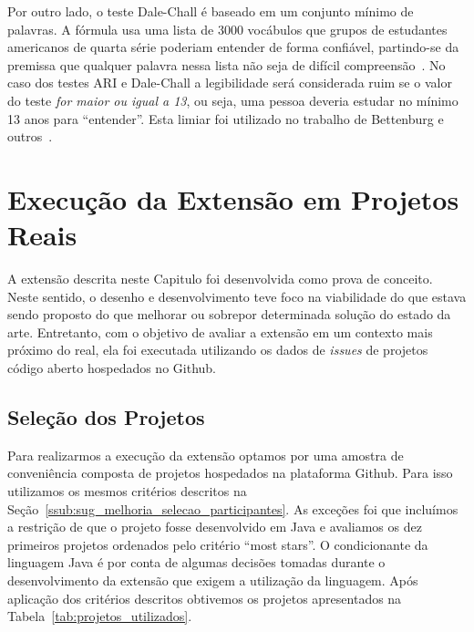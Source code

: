 Por outro lado, o teste Dale-Chall é baseado em um conjunto mínimo de palavras.
A fórmula usa uma lista de 3000 vocábulos que grupos de estudantes americanos de
quarta série poderiam entender de forma confiável, partindo-se da premissa que
qualquer palavra nessa lista não seja de difícil
compreensão~\cite{dale1948formula}. No caso dos testes ARI e Dale-Chall a
legibilidade será considerada ruim se o valor do teste \textit{for maior ou
    igual a 13}, ou seja, uma pessoa deveria estudar no mínimo 13 anos para
``entender''. Esta limiar foi utilizado no trabalho de Bettenburg e
outros~\cite{bettenburg2008makes}.

\section{Execução da Extensão em Projetos Reais}
\label{sec:avaliando_a_extensao_proposta}

A extensão descrita neste Capitulo foi desenvolvida como prova de conceito.
Neste sentido, o desenho e desenvolvimento teve foco na viabilidade do que
estava sendo proposto do que melhorar ou sobrepor determinada solução do estado
da arte. Entretanto, com o objetivo de avaliar a extensão em um contexto mais
próximo do real, ela foi executada utilizando os dados de \textit{issues} de
projetos código aberto hospedados no Github.

\subsection{Seleção dos Projetos}
\label{sub:implementacao_selecao_projetos}

Para realizarmos a execução da extensão optamos por uma amostra de conveniência
composta de projetos hospedados na plataforma Github. Para isso utilizamos os
mesmos critérios descritos na
Seção~\ref{ssub:sug_melhoria_selecao_participantes}. As exceções foi que
incluímos a restrição de que o projeto fosse desenvolvido em Java e avaliamos os
dez primeiros projetos ordenados pelo critério ``most stars''. O condicionante
da linguagem Java é por conta de algumas decisões tomadas durante o
desenvolvimento da extensão que exigem a utilização da linguagem. Após aplicação
dos critérios descritos obtivemos os projetos apresentados na
Tabela~\ref{tab:projetos_utilizados}.

\begin{table}[htpb]
\centering
{}
\caption{Projetos utilizados no testes de execução da extensão. Os dados
    apresentados tem como referência 23/04/2017.}
\label{tab:projetos_utilizados}
\end{table}

